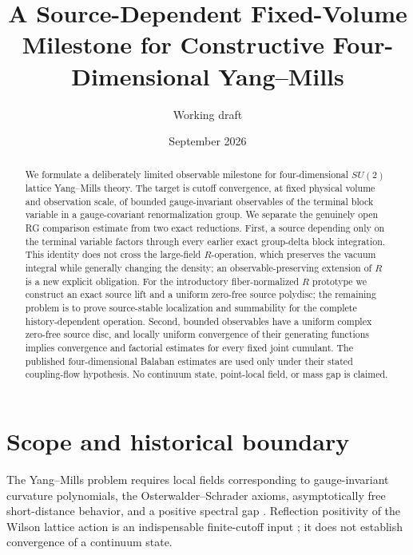 \documentclass[11pt]{article}
\title{A Source-Dependent Fixed-Volume Milestone for Constructive
Four-Dimensional Yang--Mills}
\author{Working draft}
\date{September 2026}
\theoremstyle{definition}
\theoremstyle{remark}
\begin{document}
\maketitle

\begin{abstract}
We formulate a deliberately limited observable milestone for four-dimensional
$SU(2)$ lattice Yang--Mills theory.  The target is cutoff convergence, at fixed
physical volume and observation scale, of bounded gauge-invariant observables of
the terminal block variable in a gauge-covariant renormalization group.  We
separate the genuinely open RG comparison estimate from two exact reductions.
First, a source depending only on the terminal variable factors through every
earlier exact group-delta block integration.  This identity does not cross the
large-field $R$-operation, which preserves the vacuum integral while generally
changing the density; an observable-preserving extension of $R$ is a new explicit
obligation.  For the introductory fiber-normalized $R$ prototype we construct an
exact source lift and a uniform zero-free source polydisc; the remaining problem
is to prove source-stable localization and summability for the complete
history-dependent operation.  Second, bounded observables have a uniform complex
zero-free source disc, and locally uniform convergence of their generating
functions implies convergence and factorial estimates for every fixed joint
cumulant.  The published four-dimensional Balaban estimates are used only under
their stated coupling-flow hypothesis.  No continuum state, point-local field,
or mass gap is claimed.
\end{abstract}

\section{Scope and historical boundary}

The Yang--Mills problem requires local fields corresponding to gauge-invariant
curvature polynomials, the Osterwalder--Schrader axioms, asymptotically free
short-distance behavior, and a positive spectral gap
\cite{JaffeWitten2006,OsterwalderSchrader1975}.  Reflection positivity of the
Wilson lattice action is an indispensable finite-cutoff input
\cite{OsterwalderSeiler1978}; it does not establish convergence of a continuum
state.
\end{document}
